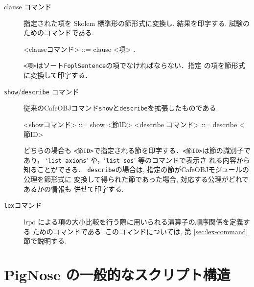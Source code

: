 \begin{description}
\item[clause コマンド]
  指定された項を Skolem 標準形の節形式に変換し, 結果を印字する. 試験の
  ためのコマンドである.

\begin{vvtm}
\begin{simplev}
  <clauseコマンド> ::= clause <項> .
\end{simplev}
\end{vvtm}

\texttt{<項>}はソート\texttt{FoplSentence}の項でなければならない．指定
の項を節形式に変換して印字する．

\item[\texttt{show}/\texttt{describe} コマンド]
  従来のCafeOBJコマンド\texttt{show}と\texttt{describe}を拡張したものである.

\begin{vvtm}
\begin{simplev}
  <showコマンド>      ::= show <節ID> 
  <describe コマンド> ::= describe <節ID>
\end{simplev}
\end{vvtm}

どちらの場合も
  \texttt{<節ID>}で指定される節を印字する．\texttt{<節ID>}は節の識別子であり，
  `\texttt{list axioms}' や，`\texttt{list sos}' 等のコマンドで表示さ
  れる内容から知ることができる．
   \texttt{describe}の場合は, 指定の節がCafeOBJモジュールの公理を節形式に
   変換して得られた節であった場合, 対応する公理がどれであるかの情報も
   併せて印字する.

\item[\texttt{lex}コマンド]
  lrpo による項の大小比較を行う際に用いられる演算子の順序関係を定義する
  ためのコマンドである. このコマンドについては, 第
  \ref{sec:lex-command} 節で説明する.

\end{description}

\section{PigNose の一般的なスクリプト構造}
\label{sec:pignose-general-scheme}

